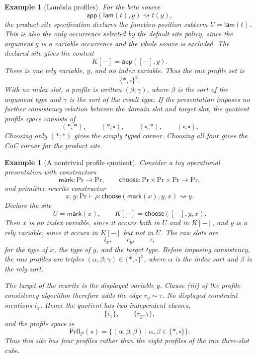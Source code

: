 \documentclass[11pt]{article}
\newcommand{\Proc}{\mathrm{Pr}}
\newcommand{\rw}{\rightsquigarrow}
\newcommand{\app}{\mathsf{app}}
\newcommand{\lam}{\mathsf{lam}}
\newcommand{\hole}{[-]}
\newcommand{\Prfl}{\mathsf{Prfl}}
\newtheorem{example}[definition]{Example}
\begin{document}
\begin{example}[Lambda profiles]
For the beta source
\[
  \app(\lam(t),y)\rw t(y),
\]
the product-site specification declares the function-position subterm \(U=\lam(t)\).  This is also the only occurrence selected by the default site policy, since the argument \(y\) is a variable occurrence and the whole source is excluded.  The declared site gives the context
\[
  K[-]=\app(\hole,y).
\]
There is one rely variable, \(y\), and no index variable. Thus the raw profile set is
\[
  \{\ast,\square\}^{2}.
\]
With no index slot, a profile is written \((\beta;\gamma)\), where \(\beta\)
is the sort of the argument type and \(\gamma\) is the sort of the result type.
If the presentation imposes no further consistency relation between the domain slot and target slot, the quotient profile space consists of
\[
  (\ast;\ast),
  \qquad
  (\ast;\square),
  \qquad
  (\square;\ast),
  \qquad
  (\square;\square).
\]
Choosing only \((\ast;\ast)\) gives the simply typed corner. Choosing all four gives the CoC corner for the product site.
\end{example}


\begin{example}[A nontrivial profile quotient]
Consider a toy operational presentation with constructors
\[
  \mathsf{mark}:\Proc\to\Proc,
  \qquad
  \mathsf{choose}:\Proc\times\Proc\times\Proc\to\Proc,
\]
and primitive rewrite constructor
\[
  x,y:\Proc
  \vdash
  \rho:
  \mathsf{choose}(\mathsf{mark}(x),y,x)\rw y.
\]
Declare the site
\[
  U=\mathsf{mark}(x),
  \qquad
  K[-]=\mathsf{choose}([-],y,x).
\]
Then \(x\) is an index variable, since it occurs both in \(U\) and in \(K[-]\),
and \(y\) is a rely variable, since it occurs in \(K[-]\) but not in \(U\).  The raw slots are
\[
  i_x,
  \qquad
  r_y,
  \qquad
  \tau,
\]
for the type of \(x\), the type of \(y\), and the target type.  Before imposing
consistency, the raw profiles are triples
\((\alpha,\beta;\gamma)\in\{\ast,\square\}^3\), where \(\alpha\) is the index sort and \(\beta\) is the rely sort.

The target of the rewrite is the displayed variable \(y\).  Clause
\textup{(iii)} of the profile-consistency algorithm therefore adds the edge
\(r_y\sim\tau\).  No displayed constraint mentions \(i_x\).  Hence the quotient
has two independent classes,
\[
  \{i_x\},
  \qquad
  \{r_y,\tau\},
\]
and the profile space is
\[
  \Prfl_{\mathcal{P}}(s)
  =
  \{(\alpha,\beta;\beta)
    \mid
    \alpha,\beta\in\{\ast,\square\}\}.
\]
Thus this site has four profiles rather than the eight profiles of the raw
three-slot cube.
\end{example}
\end{document}
